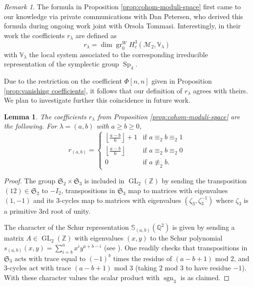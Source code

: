 \documentclass[12pt]{article}
\newcommand{\Z}{\mathbb{Z}}
\newcommand{\Q}{\mathbb{Q}}
\newcommand{\SymGroup}[1][n]{\mathfrak{S}_{#1}}
\newcommand{\Schur}[1]{\mathbb{S}_{#1}}
\newcommand{\ModuliCurve}[1]{\mathcal{M}_{#1}}
\newcommand{\sgn}[1][n]{\operatorname{sgn}_{#1}}
\DeclareMathOperator{\GL}{GL}
\DeclareMathOperator{\gr}{gr}
\theoremstyle{plain}
\newtheorem{lem}[thm]{Lemma}
\theoremstyle{definition}
\theoremstyle{remark}
\newtheorem{rmk}[thm]{Remark}
\begin{document}
\begin{rmk}
    The formula in Proposition \ref{prop:cohom-moduli-space} first came to our knowledge via private communications with Dan Petersen, who derived this formula during ongoing work joint with Orsola Tommasi. Interestingly, in their work the coefficients $r_{\lambda}$ are defined as
    \[
        r_{\lambda} = \dim \gr_0^{W}H_c^3(\ModuliCurve{2}, \mathbb{V}_{\lambda})
    \]
    with $\mathbb{V}_{\lambda}$ the local system associated to the corresponding irreducible representation of the symplectic group $\operatorname{Sp}_4$.
    
    Due to the restriction on the coefficient $\Phi[n,n]$ given in Proposition \ref{prop:vanishing coefficients}, it follows that our definition of $r_{\lambda}$ agrees with theirs. We plan to investigate further this coincidence in future work. %
\end{rmk}

\begin{lem}
    The coefficients $r_\lambda$ from Proposition \ref{prop:cohom-moduli-space} are the following. For $\lambda = (a,b)$ with $a\geq b \geq 0$,
    \[
        r_{(a,b)} = \begin{cases}
        \left\lfloor{\frac{a-b}{6}}\right\rfloor +1 & \text{if }a\equiv_2 b \equiv_2 1 \\
        \left\lfloor{\frac{a-b}{6}}\right\rfloor & \text{if }a\equiv_2 b \equiv_2 0 \\
        0 & \text{if }a\not\equiv_2 b .
        \end{cases}
    \]
\end{lem}
\begin{proof}
    The group $\SymGroup[2]\times\SymGroup[3]$ is included in $\GL_2(\Z)$ by sending the transposition $(12)\in \SymGroup[2]$ to $-I_2$, transpositions in $\SymGroup[3]$ map to matrices with eigenvalues $(1,-1)$ and its $3$-cycles map to matrices with eigenvalues $(\zeta_3,\zeta_3^{-1})$ where $\zeta_3$ is a primitive $3$rd root of unity.
    
    The character of the Schur representation $\Schur{(a,b)}(\Q^2)$ is given by sending a matrix $A\in \GL_2(\Z)$ with eigenvalues $(x,y)$ to the Schur polynomial $s_{(a,b)}(x,y) = \sum_{i=b}^a x^i y^{a+b-i}$ (see \cite[\S I.3]{MacDonald}).
    One readily checks that transpositions in $\SymGroup[3]$ acts with trace equal to $(-1)^b$ times the residue of $(a-b+1)$ mod $2$, and $3$-cycles act with trace $(a-b+1)$ mod $3$ (taking $2$ mod $3$ to have residue $-1$).
    With these character values the scalar product with $\sgn[3]$ is as claimed.
\end{proof}
\end{document}
